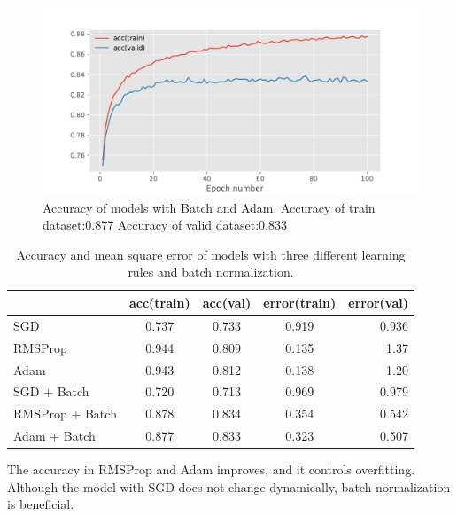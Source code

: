 \documentclass{article}
\begin{document}
\begin{figure}[h]
\vskip 5mm
\begin{center}
\centerline{\includegraphics[width=\columnwidth]{h.pdf}}
\caption{Accuracy of models with Batch and Adam. \n
Accuracy of train dataset:0.877 \n
Accuracy of valid dataset:0.833
}
\end{center}
\vskip -5mm
\end{figure}

\begin{table}[h]
\vskip 3mm
\begin{center}
\begin{small}
\begin{sc}
\begin{tabular}{lcccr}
\hline
\abovespace\belowspace
&acc(train) & acc(val) & error(train) & error(val) \\
\hline
\abovespace
SGD     & 0.737      & 0.733           & 0.919        & 0.936             \\ \hline
RMSProp & 0.944      & 0.809           & 0.135        & 1.37              \\ \hline
Adam    & 0.943      & 0.812           & 0.138        & 1.20              \\
\hline
SGD + Batch & 0.720 & 0.713           & 0.969        & 0.979               \\
\hline
RMSProp + Batch & 0.878  &0.834     & 0.354      & 0.542                     \\
\hline
Adam + Batch & 0.877 & 0.833        & 0.323     & 0.507                 \\
\hline
\end{tabular}
\end{sc}
\end{small}
\caption{Accuracy and mean square error of models with three different learning rules and batch normalization.}
\label{tab:sample-table}
\end{center}
\vskip -3mm
\end{table}
The accuracy in RMSProp and Adam improves, and it controls overfitting. Although the model with SGD does not change dynamically, batch normalization is beneficial.
\end{document}
